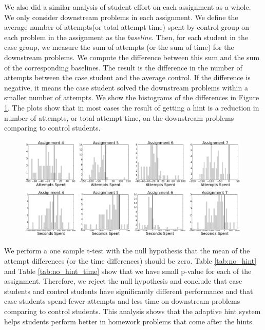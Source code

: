 \documentclass{llncs2e/llncs}
\begin{document}
We also did a similar analysis of student effort on each assignment as a whole. We only consider downstream problems in each assignment. We define the average number of attempts(or total attempt time) spent by control group on each problem in the assignment as the {\em baseline}. Then, for each student in the case group, we measure the sum of attempts (or the sum of time) for the downstream problems. We compute the difference between this sum and the sum of the corresponding baselines. The result is the difference in the number of attempts between the case student and the average control. If the difference is negative, it means the case student solved the downstream problems within a smaller number of attempts. We show the histograms of the differences in Figure \ref{fig:downstream_analysis}. The plots show that in most cases the result of getting a hint is a reduction in number of attempts, or total attempt time, on the downstream problems comparing to control students.

\begin{figure}[th]
\centering
	\includegraphics[width=0.99\textwidth]{image/assignment_tries_downstream.png}\\
	\includegraphics[width=0.99\textwidth]{image/assignment_time_downstream.png}
\label{fig:downstream_analysis}

\end{figure}

We perform a one sample t-test with the null hypothesis that the mean of the attempt differences (or the time differences) should be zero. Table \ref{tab:no_hint} and Table \ref{tab:no_hint_time} show that we have small p-value for each of the assignment. Therefore, we reject the null hypothesis and conclude that case students and control students have significantly different performance and that case students spend fewer attempts and less time on downstream problems comparing to control students. This analysis shows that the adaptive hint system helps students perform better in homework problems that come after the hints.
\end{document}
